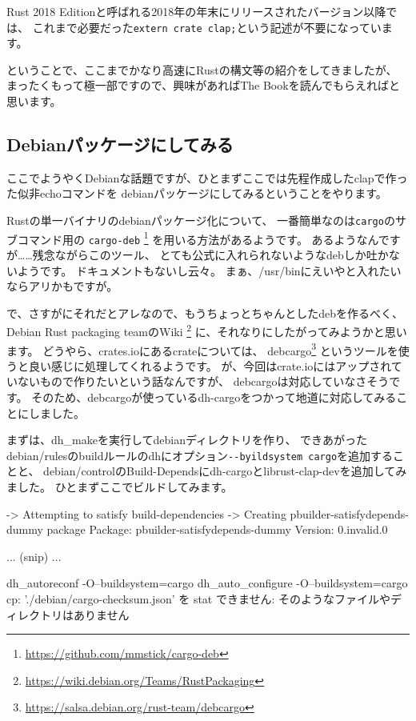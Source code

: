 \documentclass[mingoth,a4paper]{jsarticle}
\begin{document}
Rust 2018 Editionと呼ばれる2018年の年末にリリースされたバージョン以降では、
これまで必要だった\verb|extern crate clap;|という記述が不要になっています。

ということで、ここまでかなり高速にRustの構文等の紹介をしてきましたが、
まったくもって極一部ですので、興味があればThe Bookを読んでもらえればと思います。

\subsection{Debianパッケージにしてみる}

ここでようやくDebianな話題ですが、ひとまずここでは先程作成したclapで作った似非echoコマンドを
debianパッケージにしてみるということをやります。

Rustの単一バイナリのdebianパッケージ化について、
一番簡単なのは\texttt{cargo}のサブコマンド用の
\texttt{cargo-deb}%
\footnote{\url{https://github.com/mmstick/cargo-deb}}%
を用いる方法があるようです。
あるようなんですが……残念ながらこのツール、
とても公式に入れられないようなdebしか吐かないようです。
ドキュメントもないし云々。
まぁ、/usr/binにえいやと入れたいならアリかもですが。

で、さすがにそれだとアレなので、もうちょっとちゃんとしたdebを作るべく、
Debian Rust packaging teamのWiki%
\footnote{\url{https://wiki.debian.org/Teams/RustPackaging}}%
に、それなりにしたがってみようかと思います。
どうやら、crates.ioにあるcrateについては、
debcargo\footnote{\url{https://salsa.debian.org/rust-team/debcargo}}%
というツールを使うと良い感じに処理してくれるようです。
が、今回はcrate.ioにはアップされていないもので作りたいという話なんですが、
debcargoは対応していなさそうです。
そのため、debcargoが使っているdh-cargoをつかって地道に対応してみることにしました。

まずは、dh\_makeを実行してdebianディレクトリを作り、
できあがったdebian/rulesのbuildルールのdhにオプション\verb|--byildsystem cargo|を追加することと、
debian/controlのBuild-Dependsにdh-cargoとlibrust-clap-devを追加してみました。
ひとまずここでビルドしてみます。

\begin{commandline}
-> Attempting to satisfy build-dependencies
-> Creating pbuilder-satisfydepends-dummy package
Package: pbuilder-satisfydepends-dummy
Version: 0.invalid.0

... (snip) ...

dh_autoreconf -O--buildsystem=cargo
dh_auto_configure -O--buildsystem=cargo
cp: './debian/cargo-checksum.json' を stat できません: そのようなファイルやディレクトリはありません
\end{commandline}
\end{document}
